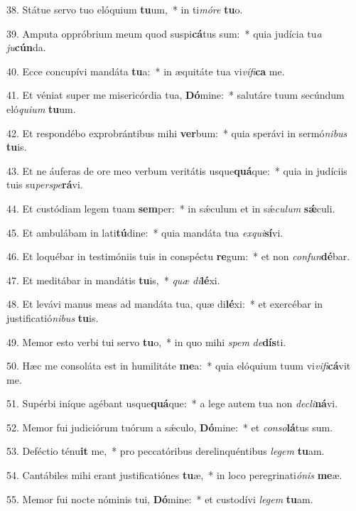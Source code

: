 38. Státue servo tuo elóquium \textbf{tu}um,~*  in ti\textit{mó}\textit{re} \textbf{tu}o.\

39. Amputa oppróbrium meum quod suspi\textbf{cá}tus sum:~*  quia judícia tu\textit{a} \textit{ju}\textbf{cún}da.\

40. Ecce concupívi mandáta \textbf{tu}a:~*  in æquitáte tua vi\textit{ví}\textit{fi}\textbf{ca} me.\

41. Et véniat super me misericórdia tua, \textbf{Dó}mine:~*  salutáre tuum secúndum eló\textit{qui}\textit{um} \textbf{tu}um.\

42. Et respondébo exprobrántibus mihi \textbf{ver}bum:~*  quia sperávi in sermó\textit{ni}\textit{bus} \textbf{tu}is.\

43. Et ne áuferas de ore meo verbum veritátis usque\textbf{quá}que:~*  quia in judíciis tuis su\textit{per}\textit{spe}\textbf{rá}vi.\

44. Et custódiam legem tuam \textbf{sem}per:~*  in sǽculum et in sǽ\textit{cu}\textit{lum} \textbf{sǽ}culi.\

45. Et ambulábam in lati\textbf{tú}dine:~*  quia mandáta tua \textit{ex}\textit{qui}\textbf{sí}vi.\

46. Et loquébar in testimóniis tuis in conspéctu \textbf{re}gum:~*  et non \textit{con}\textit{fun}\textbf{dé}bar.\

47. Et meditábar in mandátis \textbf{tu}is,~*  \textit{quæ} \textit{di}\textbf{lé}xi.\

48. Et levávi manus meas ad mandáta tua, quæ di\textbf{lé}xi:~*  et exercébar in justificatió\textit{ni}\textit{bus} \textbf{tu}is.\

49. Memor esto verbi tui servo \textbf{tu}o,~*  in quo mihi \textit{spem} \textit{de}\textbf{dís}ti.\

50. Hæc me consoláta est in humilitáte \textbf{me}a:~*  quia elóquium tuum vi\textit{vi}\textit{fi}\textbf{cá}vit me.\

51. Supérbi iníque agébant usque\textbf{quá}que:~*  a lege autem tua non \textit{de}\textit{cli}\textbf{ná}vi.\

52. Memor fui judiciórum tuórum a sǽculo, \textbf{Dó}mine:~*  et \textit{con}\textit{so}\textbf{lá}tus sum.\

53. Deféctio ténu\textbf{it} me,~*  pro peccatóribus derelinquéntibus \textit{le}\textit{gem} \textbf{tu}am.\

54. Cantábiles mihi erant justificatiónes \textbf{tu}æ,~*  in loco peregrinati\textit{ó}\textit{nis} \textbf{me}æ.\

55. Memor fui nocte nóminis tui, \textbf{Dó}mine:~*  et custodívi \textit{le}\textit{gem} \textbf{tu}am.\

